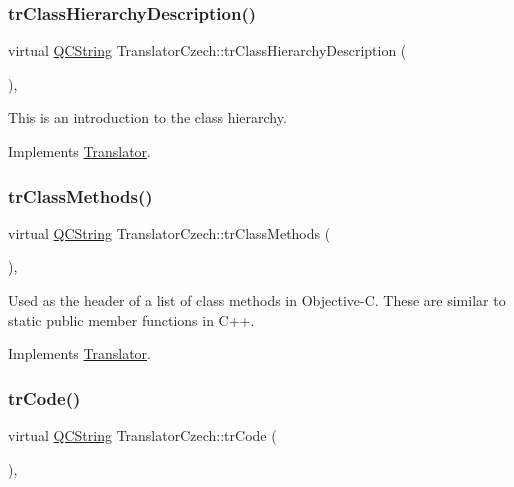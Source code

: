 \subsubsection{\texorpdfstring{trClassHierarchyDescription()}{trClassHierarchyDescription()}}
{\footnotesize\ttfamily virtual \mbox{\hyperlink{class_q_c_string}{Q\+C\+String}} Translator\+Czech\+::tr\+Class\+Hierarchy\+Description (\begin{DoxyParamCaption}{ }\end{DoxyParamCaption})\hspace{0.3cm}{\ttfamily [inline]}, {\ttfamily [virtual]}}

This is an introduction to the class hierarchy. 

Implements \mbox{\hyperlink{class_translator}{Translator}}.

\mbox{\label{class_translator_czech_ab5237ede416d7c005951eb006e57035d}} 
\subsubsection{\texorpdfstring{trClassMethods()}{trClassMethods()}}
{\footnotesize\ttfamily virtual \mbox{\hyperlink{class_q_c_string}{Q\+C\+String}} Translator\+Czech\+::tr\+Class\+Methods (\begin{DoxyParamCaption}{ }\end{DoxyParamCaption})\hspace{0.3cm}{\ttfamily [inline]}, {\ttfamily [virtual]}}

Used as the header of a list of class methods in Objective-\/C. These are similar to static public member functions in C++. 

Implements \mbox{\hyperlink{class_translator}{Translator}}.

\mbox{\label{class_translator_czech_af2f5836910df98603882967a7673c9aa}} 
\subsubsection{\texorpdfstring{trCode()}{trCode()}}
{\footnotesize\ttfamily virtual \mbox{\hyperlink{class_q_c_string}{Q\+C\+String}} Translator\+Czech\+::tr\+Code (\begin{DoxyParamCaption}{ }\end{DoxyParamCaption})\hspace{0.3cm}{\ttfamily [inline]}, {\ttfamily [virtual]}}


